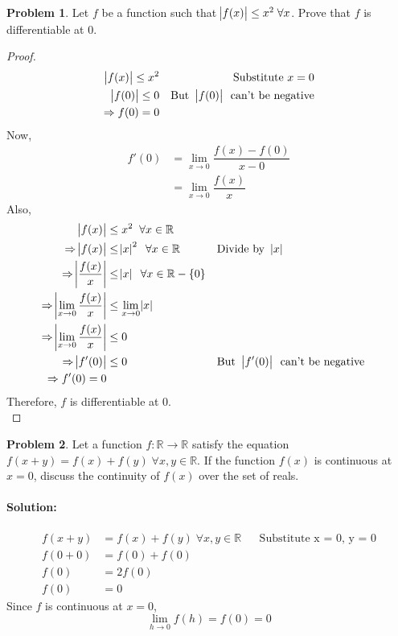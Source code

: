 \documentclass[14]{article}
\theoremstyle{definition}
\newtheorem{prob}{Problem}
\theoremstyle{case}
\begin{document}
\pagebreak
\begin{prob}
Let $f$ be a function such that $\abs{f(x)} \leq x^2 \; \forall x$. Prove that $f$ is differentiable at 0.
\begin{proof}
\begin{align*}
\abs{f(x)} \leq x^2 && \text{Substitute $x = 0$}\\
\abs{f(0)} \leq 0 && \text{But \abs{f(0)} can't be negative}\\
\Rightarrow f(0) = 0
\end{align*}
Now,
\begin{align*}
f'(0) &= \lim\limits_{x \to 0} \dfrac{f(x) - f(0)}{x - 0}\\
&= \lim\limits_{x \to 0} \dfrac{f(x)}{x}
\end{align*}
Also,
\begin{align*}
\abs{f(x)} &\leq x^2 \;\; \forall x \in \mathbb{R}\\
\Rightarrow \abs{f(x)} &\leq \abs{x}^2\;\; \forall x \in \mathbb{R} && \text{Divide by \abs{x}}\\
\Rightarrow \abs{\dfrac{f(x)}{x}} &\leq \abs{x}\;\; \forall x \in \mathbb{R} - \{0\}\\
\Rightarrow \abs{\lim\limits_{x \to 0} \dfrac{f(x)}{x}} &\leq \lim\limits_{x \to 0} \abs{x}\\
\Rightarrow \abs{\lim\limits_{x \to 0} \dfrac{f(x)}{x}} &\leq 0\\
\Rightarrow \abs{f'(0)} &\leq 0 && \text{But \abs{f'(0)} can't be negative}\\
\Rightarrow f'(0) = 0
\end{align*}
Therefore, $f$ is differentiable at 0.\\
\end{proof}
\end{prob}
\begin{prob}
Let a function $f : \mathbb{R} \to \mathbb{R}$ satisfy the equation $f(x + y) = f(x) + f(y) \; \forall x, y \in \mathbb{R}$. If the function $f(x)$ is continuous at $x = 0$, discuss the continuity of $f(x)$ over the set of reals.
\paragraph{Solution:}
\begin{align*}
f(x + y) &= f(x) + f(y)\;\forall x, y\in \mathbb{R} && \text{Substitute x = 0, y = 0}\\
f(0 + 0) &= f(0) + f(0)\\
f(0) &= 2 f(0)\\
f(0) &= 0
\end{align*}
Since $f$ is continuous at $x = 0$,
\[\lim\limits_{h \to 0} f(h) = f(0) = 0\]
\end{prob}
\end{document}
